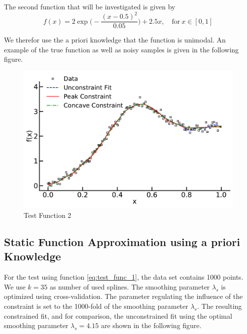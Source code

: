\documentclass[10pt,a4paper]{article}
\begin{document}
The second function that will be investigated is given by
\begin{equation} \label{eq:test_func_2}
	f(x) = 2\exp \big(-\frac{(x-0.5)^2}{0.05} \big) + 2.5x, \quad \text{for} \ x \in [0,1]
\end{equation}

We therefor use the a priori knowledge that the function is unimodal. An example of the true function as well as noisy samples is given in the following figure.

\begin{figure}[H]
	\centering
	\includegraphics[width=\columnwidth]{../thesisplots/exp_peak1.pdf}
	\caption{Test Function 2}
	\label{fig:test_func_2}
\end{figure}

\subsection{Static Function Approximation using a priori Knowledge}

For the test using function \ref{eq:test_func_1}, the data set contains 1000 points. We use $k=35$ as number of used splines. The smoothing parameter $\lambda_s$ is optimized using cross-validation. The parameter regulating the influence of the constraint is set to the 1000-fold of the smoothing parameter $\lambda_s$. The resulting constrained fit, and for comparison, the unconstrained fit using the optimal smoothing parameter $\lambda_s = 4.15$ are shown in the following figure.
\end{document}

